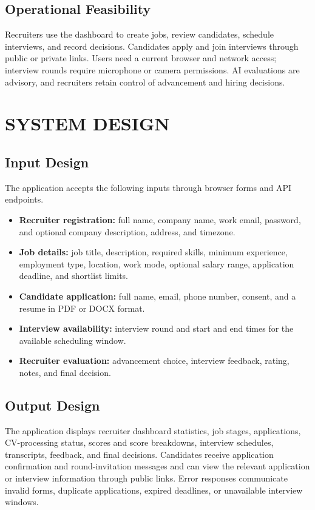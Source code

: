 \section{Operational Feasibility}
Recruiters use the dashboard to create jobs, review candidates, schedule interviews, and record decisions. Candidates apply and join interviews through public or private links. Users need a current browser and network access; interview rounds require microphone or camera permissions. AI evaluations are advisory, and recruiters retain control of advancement and hiring decisions.
%
\chapter{SYSTEM DESIGN}
%
\section{Input Design}
The application accepts the following inputs through browser forms and API endpoints.
\begin{itemize}
\item \textbf{Recruiter registration:} full name, company name, work email, password, and optional company description, address, and timezone.
\item \textbf{Job details:} job title, description, required skills, minimum experience, employment type, location, work mode, optional salary range, application deadline, and shortlist limits.
\item \textbf{Candidate application:} full name, email, phone number, consent, and a resume in PDF or DOCX format.
\item \textbf{Interview availability:} interview round and start and end times for the available scheduling window.
\item \textbf{Recruiter evaluation:} advancement choice, interview feedback, rating, notes, and final decision.
\end{itemize}
%
\section{Output Design}
The application displays recruiter dashboard statistics, job stages, applications, CV-processing status, scores and score breakdowns, interview schedules, transcripts, feedback, and final decisions. Candidates receive application confirmation and round-invitation messages and can view the relevant application or interview information through public links. Error responses communicate invalid forms, duplicate applications, expired deadlines, or unavailable interview windows.
%
